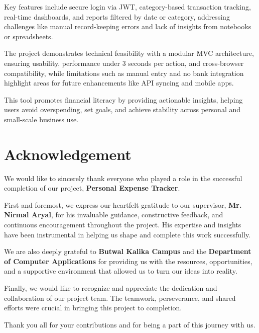 \documentclass[12pt]{report}
\begin{document}
Key features include secure login via JWT, category-based transaction tracking, real-time dashboards, and reports filtered by date or category, addressing challenges like manual record-keeping errors and lack of insights from notebooks or spreadsheets.

The project demonstrates technical feasibility with a modular MVC architecture, ensuring usability, performance under 3 seconds per action, and cross-browser compatibility, while limitations such as manual entry and no bank integration highlight areas for future enhancements like API syncing and mobile apps.

This tool promotes financial literacy by providing actionable insights, helping users avoid overspending, set goals, and achieve stability across personal and small-scale business use.

\newpage

\cleardoublepage
{}
{}
\chapter*{Acknowledgement}
\thispagestyle{plain}

We would like to sincerely thank everyone who played a role in the successful completion of our project, \textbf{Personal Expense Tracker}.

First and foremost, we express our heartfelt gratitude to our supervisor, \textbf{Mr. Nirmal Aryal}, for his invaluable guidance, constructive feedback, and continuous encouragement throughout the project. His expertise and insights have been instrumental in helping us shape and complete this work successfully.

We are also deeply grateful to \textbf{Butwal Kalika Campus} and the \textbf{Department of Computer Applications} for providing us with the resources, opportunities, and a supportive environment that allowed us to turn our ideas into reality.

Finally, we would like to recognize and appreciate the dedication and collaboration of our project team. The teamwork, perseverance, and shared efforts were crucial in bringing this project to completion.

Thank you all for your contributions and for being a part of this journey with us.

\newpage

\centering{}
\end{document}
